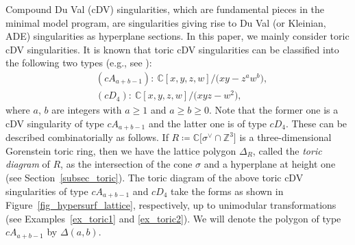 \documentclass[10pt,a4paper]{amsart}
\numberwithin{equation}{section}
\theoremstyle{definition}
\newcommand{\ZZ}{\mathbb{Z}}
\newcommand{\CC}{\mathbb{C}}
\begin{document}
Compound Du Val (cDV) singularities, which are fundamental pieces in the minimal model program,
are singularities giving rise to Du Val (or Kleinian, ADE) singularities as hyperplane sections.
In this paper, we mainly consider toric cDV singularities.
It is known that toric cDV singularities can be classified into the following two types (e.g., see \cite[footnote~18]{Dais_toric}):
\begin{align*}
& (cA_{a+b-1})\colon \ \CC[x,y,z,w]/\bigl(xy-z^aw^b\bigr), \\
& (cD_4)\colon \ \CC[x,y,z,w]/\bigl(xyz-w^2\bigr),
\end{align*}
where $a$, $b$ are integers with $a\ge 1$ and $a\ge b\ge0$.
Note that the former one is a cDV singularity of type $cA_{a+b-1}$ and the latter one is of type $cD_4$.
These can be described combinatorially as follows.
If $R\coloneqq\CC\bigl[\sigma^\vee\cap \ZZ^3\bigr]$ is a three-dimensional Gorenstein toric ring, then we have the lattice polygon $\Delta_R$,
called the \emph{toric diagram} of $R$, as the intersection of the cone $\sigma$ and a hyperplane at height one (see Section~\ref{subsec_toric}).
The toric diagram of the above toric cDV singularities of type $cA_{a+b-1}$ and $cD_4$ take the forms
as shown in Figure~\ref{fig_hypersurf_lattice}, respectively, up to unimodular transformations (see Examples~\ref{ex_toric1} and \ref{ex_toric2}).
We will denote the polygon of type $cA_{a+b-1}$ by $\Delta(a,b)$.
\end{document}
